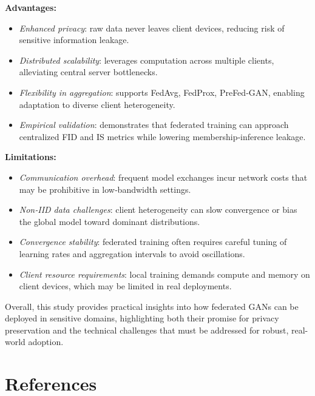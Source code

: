 \documentclass{article}
\begin{document}
\medskip

\noindent\textbf{Advantages:}
\begin{itemize}
  \item \emph{Enhanced privacy}: raw data never leaves client devices, reducing risk of sensitive information leakage.
  \item \emph{Distributed scalability}: leverages computation across multiple clients, alleviating central server bottlenecks.
  \item \emph{Flexibility in aggregation}: supports FedAvg, FedProx, PreFed‑GAN, enabling adaptation to diverse client heterogeneity.
  \item \emph{Empirical validation}: demonstrates that federated training can approach centralized FID and IS metrics while lowering membership‑inference leakage.
\end{itemize}

\medskip

\noindent\textbf{Limitations:}
\begin{itemize}
  \item \emph{Communication overhead}: frequent model exchanges incur network costs that may be prohibitive in low‑bandwidth settings.
  \item \emph{Non‑IID data challenges}: client heterogeneity can slow convergence or bias the global model toward dominant distributions.
  \item \emph{Convergence stability}: federated training often requires careful tuning of learning rates and aggregation intervals to avoid oscillations.
  \item \emph{Client resource requirements}: local training demands compute and memory on client devices, which may be limited in real deployments.
\end{itemize}

\medskip

\noindent Overall, this study provides practical insights into how federated GANs can be deployed in sensitive domains, highlighting both their promise for privacy preservation and the technical challenges that must be addressed for robust, real-world adoption.


\section*{References}
\end{document}
